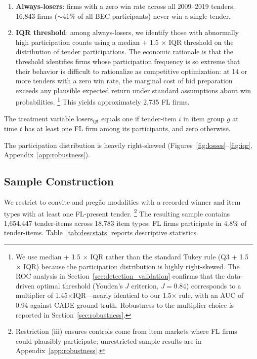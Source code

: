 \begin{enumerate}
  \item \textbf{Always-losers}: firms with a zero win rate across all
    2009--2019 tenders. 16,843 firms ($\sim$41\% of all
    BEC participants) never win a single tender.
  \item \textbf{IQR threshold}: among always-losers, we identify those
    with abnormally high participation counts using a median + 1.5
    $\times$ IQR threshold on the distribution of tender
    participations. The economic rationale is that the threshold
    identifies firms whose participation frequency is so extreme that
    their behavior is difficult to rationalize as competitive
    optimization: at 14 or more tenders with a zero win rate, the
    marginal cost of bid preparation exceeds any plausible expected
    return under standard assumptions about win probabilities.%
    \footnote{We use median + 1.5 $\times$ IQR rather than the standard
    Tukey rule (Q3 + 1.5 $\times$ IQR) because the participation
    distribution is highly right-skewed. The ROC analysis in
    Section~\ref{sec:detection_validation} confirms that the
    data-driven optimal threshold (Youden's $J$ criterion,
    $J = 0.84$) corresponds to a multiplier of
    1.45$\times$IQR---nearly identical to our 1.5$\times$ rule,
    with an AUC of 0.94 against CADE ground truth.
    Robustness to the multiplier choice is reported in
    Section~\ref{sec:robustness}.}
    This yields approximately 2,735 FL firms.
\end{enumerate}

The treatment variable $\text{losers}_{igt}$ equals one if tender-item
$i$ in item group $g$ at time $t$ has at least one FL firm among its
participants, and zero otherwise.

The participation distribution is heavily right-skewed (Figures~\ref{fig:losses}--\ref{fig:iqr}, Appendix~\ref{app:robustness}).

\subsection{Sample Construction}
\label{sec:sample}

We restrict to convite and preg\~ao modalities with a recorded winner and item types with at least one FL-present tender.%
\footnote{Restriction (iii) ensures controls come from item markets where FL firms could plausibly participate; unrestricted-sample results are in Appendix~\ref{app:robustness}.}
The resulting sample contains 1,654,447 tender-items across 18,783 item types. FL firms participate in 4.8\% of tender-items. Table~\ref{tab:descstats} reports descriptive statistics.

